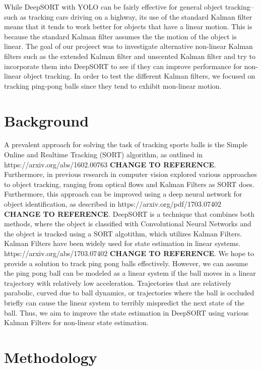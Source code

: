 \documentclass[10pt,twocolumn,letterpaper]{article}
\begin{document}
  While DeepSORT with YOLO can be fairly effective for general object tracking--such as tracking 
  cars driving on a highway, its use of the standard Kalman filter means that it tends to work better for 
  objects that have a linear motion. This is because the standard Kalman filter assumes the the motion of the object is linear.  
  The goal of our projeect was to investigate alternative non-linear Kalman filters such as the extended Kalman filter and 
  unscented Kalman filter and try to incorporate them into DeepSORT to see if they can improve performance for non-linear object tracking. 
  In order to test the different Kalman filters, we focused on tracking ping-pong balls since they tend to exhibit mon-linear motion. 


\section{Background}
\label{sec:background}



A prevalent approach for
solving the task of tracking sports balls is the Simple Online and Realtime Tracking (SORT) algorithm, as outlined in
https://arxiv.org/abs/1602.00763 \textbf{CHANGE TO REFERENCE}. 
Furthermore, in previous research in computer vision explored various approaches to object tracking, ranging from optical
 flows and Kalman Filters as SORT does. Furthermore, this approach can be
improved using a deep neural network for object identification, as described in
https://arxiv.org/pdf/1703.07402 \textbf{CHANGE TO REFERENCE}.
DeepSORT is a technique that combines both methods, where the object is classified with
Convolutional Neural Networks and the object is tracked using a SORT algotithm, which utilizes Kalman Filters. 
Kalman Filters have been widely used for state estimation in linear systems. https://arxiv.org/abs/1703.07402 \textbf{CHANGE TO REFERENCE}.
We hope to provide a solution to track ping pong balls effectively. However, we can assume the ping pong ball can be modeled as a linear system
if the ball moves in a linear trajectory with relatively low acceleration. Trajectories that are relatively parabolic, curved due to ball dynamics, or trajectories where the ball is occluded briefly can cause the linear system to terribly mispredict the next state of the ball. Thus, we aim to improve the state estimation in DeepSORT using various Kalman Filters for non-linear state estimation.


\section{Methodology}
\label{sec:methodology}
\end{document}
